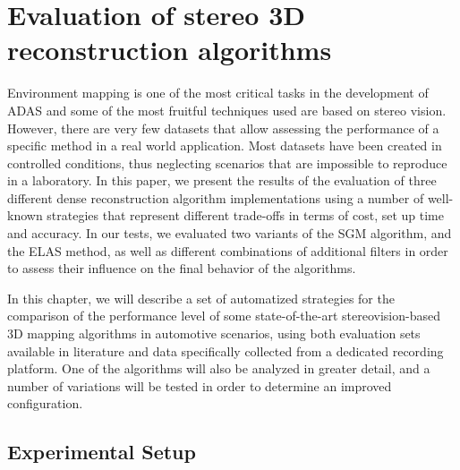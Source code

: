 
\graphicspath{{./images/chapter03/bmps/}{./images/chapter03/vects/}{./images/chapter03/}}

\chapter{Evaluation of stereo 3D reconstruction algorithms}\label{ch:chapter03}

Environment mapping is one of the most critical tasks in the development of \ac{ADAS} and some of the most fruitful techniques used are based on stereo vision. However, there are very few datasets that allow assessing the performance of a specific method in a real world application. Most datasets have been created in controlled conditions, thus neglecting scenarios that are impossible to reproduce in a laboratory. In this paper, we present the results of the evaluation of three different dense reconstruction algorithm implementations using a number of well-known strategies that represent different trade-offs in terms of cost, set up time and accuracy. In our tests, we evaluated two variants of the \acf{SGM} algorithm, and the \acf{ELAS} method, as well as different combinations of additional filters in order to assess their influence on the final behavior of the algorithms.

In this chapter, we will describe a set of automatized strategies for the comparison of the performance level of some state-of-the-art stereovision-based 3D mapping algorithms in automotive scenarios, using both evaluation sets available in literature and data specifically collected from a dedicated recording platform. One of the algorithms will also be analyzed in greater detail, and a number of variations will be tested in order to determine an improved configuration.

\section{Experimental Setup}\label{ch:chapter03_01}

